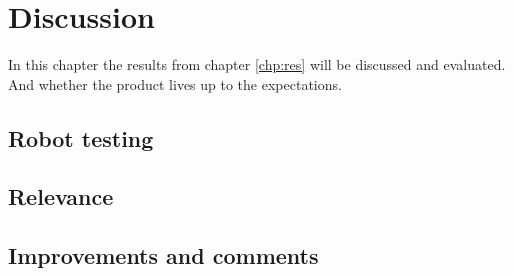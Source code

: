 \chapter{Discussion}
\label{chp:disc}
In this chapter the results from chapter \ref{chp:res} will be discussed and evaluated. And whether the product lives up to the expectations.

\section{Robot testing}

\section{Relevance}
\section{Improvements and comments}